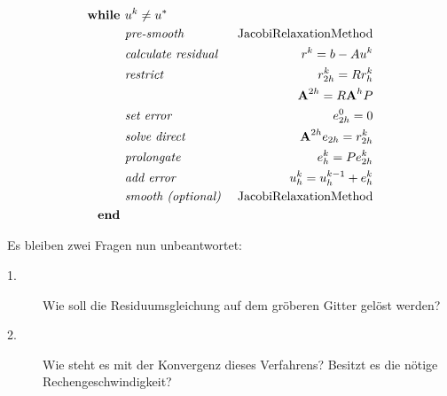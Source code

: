 

\begin{eqnarray}
\textbf{while }                                 &u^{k} \ne u^{*} \notag \\
&\textit{pre-smooth }                         &\textnormal{JacobiRelaxationMethod} \notag \\
&\textit{calculate residual }        &r^{k} = b - Au^{k} \notag \\
&\textit{restrict }                         &r^{k}_{2h}=Rr^{k}_{h} \notag \\
&                                                                &{\textbf{A}}^{2h} = R{\textbf{A}}^{h}P \notag \\
&\textit{set error }                        &e^{0}_{2h} = 0 \notag \\
&\textit{solve direct }                        &{\textbf{A}}^{2h} e_{2h} = r^{k}_{2h} \notag \\
&\textit{prolongate }                        &e^{k}_{h} = Pe^{k}_{2h} \notag \\
&\textit{add error }                        &u^{k}_{h} = u^{k-1}_{h} + e^{k}_{h} \notag \\
&\textit{smooth (optional) }        &\textnormal{JacobiRelaxationMethod} \notag \\
\textbf{end } \notag
\end{eqnarray}

Es bleiben zwei Fragen nun unbeantwortet:
\begin{description}
\item[1.] Wie soll die Residuumsgleichung auf dem gröberen Gitter gelöst werden?
\item[2.] Wie steht es mit der Konvergenz dieses Verfahrens? Besitzt es die nötige Rechengeschwindigkeit?
\end{description}

